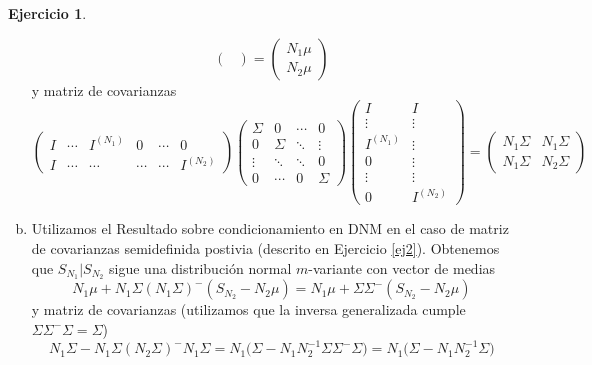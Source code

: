 \documentclass[12pt,spanish]{article}
\theoremstyle{definition}
\newtheorem{exercise}{Ejercicio}
\begin{document}
\begin{exercise}
\begin{enumerate}[a)]
\[\begin{pmatrix}
    \end{pmatrix}=
    \begin{pmatrix}
      N_1\mu \\ N_2\mu
    \end{pmatrix}\]
  y matriz de covarianzas
  \[\begin{pmatrix}
      I & \cdots & I^{(N_1)} & 0 & \cdots & 0 \\
      I & \cdots & \cdots & \cdots & \cdots & I^{(N_2)}
    \end{pmatrix}\begin{pmatrix}
      \Sigma & 0 & \cdots & 0 \\
      0 & \Sigma & \ddots & \vdots \\
      \vdots & \ddots & \ddots & 0\\
      0 & \cdots & 0 & \Sigma
    \end{pmatrix}\begin{pmatrix}
      I & I \\ \vdots & \vdots \\ I^{(N_1)} & \vdots \\ 0 & \vdots \\ \vdots & \vdots \\ 0 &I^{(N_2)}
    \end{pmatrix}=
    \begin{pmatrix}
      N_1\Sigma & N_1\Sigma \\ N_1\Sigma & N_2\Sigma
    \end{pmatrix}\]
\item Utilizamos el Resultado sobre condicionamiento en DNM en el caso
  de matriz de covarianzas semidefinida postivia (descrito en
  Ejercicio \ref{ej2}). Obtenemos que $S_{N_1}|S_{N_2}$ sigue una
  distribución normal $m$-variante con vector de medias
  \[N_1\mu+N_1\Sigma(N_1\Sigma)^-(S_{N_2}-N_2\mu)=N_1\mu+\Sigma\Sigma^-(S_{N_2}-N_2\mu)\]
  y matriz de covarianzas (utilizamos que la inversa generalizada
  cumple $\Sigma\Sigma^-\Sigma=\Sigma$)
  \[N_1\Sigma-N_1\Sigma(N_2\Sigma)^-N_1\Sigma=N_1\Big(\Sigma-N_1N_2^{-1}\Sigma\Sigma^-\Sigma\Big)=N_1\Big(\Sigma-N_1N_2^{-1}\Sigma\Big)\]
  \end{enumerate}
\end{exercise}
\end{document}
